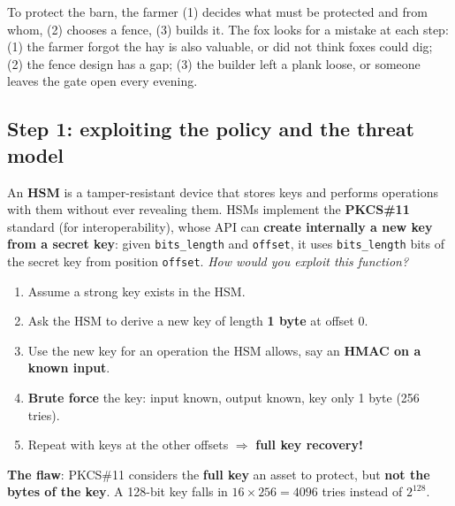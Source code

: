 \begin{goatbox}
To protect the barn, the farmer (1) decides what must be protected and from whom, (2) chooses a
fence, (3) builds it. The fox looks for a mistake at each step: (1) the farmer forgot the hay is
also valuable, or did not think foxes could dig; (2) the fence design has a gap; (3) the builder
left a plank loose, or someone leaves the gate open every evening.
\end{goatbox}

\subsection{Step 1: exploiting the policy and the threat model}

\begin{exbox}[title={Misidentified assets: extracting keys from Hardware Security Modules (HSMs)}]
An \textbf{HSM} is a tamper-resistant device that stores keys and performs operations with them
without ever revealing them. HSMs implement the \textbf{PKCS\#11} standard (for interoperability),
whose API can \textbf{create internally a new key from a secret key}: given \texttt{bits\_length}
and \texttt{offset}, it uses \texttt{bits\_length} bits of the secret key from position
\texttt{offset}. \emph{How would you exploit this function?}
\begin{enumerate}
  \item Assume a strong key exists in the HSM.
  \item Ask the HSM to derive a new key of length \textbf{1 byte} at offset 0.
  \item Use the new key for an operation the HSM allows, say an \textbf{HMAC on a known input}.
  \item \textbf{Brute force} the key: input known, output known, key only 1 byte (256 tries).
  \item Repeat with keys at the other offsets $\Rightarrow$ \textbf{full key recovery!}
\end{enumerate}
\textbf{The flaw}: PKCS\#11 considers the \textbf{full key} an asset to protect, but \textbf{not the
bytes of the key}. A 128-bit key falls in $16 \times 256 = 4096$ tries instead of $2^{128}$.
\end{exbox}

